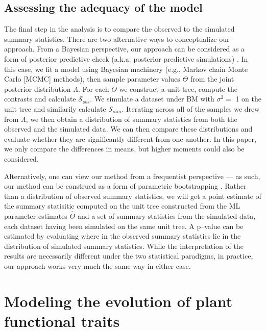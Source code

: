 \documentclass[a4paper,12pt]{article}
\begin{document}
\subsection{Assessing the adequacy of the model}
The final step in the analysis is to compare the observed to the simulated summary statistics. There are two alternative ways to conceptualize our approach. From a Bayesian perspective, our approach can be considered as a form of posterior predictive check (a.k.a. posterior predictive simulations) \citep{Rubin1984, Gelman1996}. In this case, we fit a model using Bayesian machinery (e.g., Markov chain Monte Carlo [MCMC] methods), then sample parameter values $\Theta$ from the joint posterior distribution $\Lambda$. For each $\Theta$ we construct a unit tree, compute the contrasts and calculate $\mathcal{S}_{obs}$. We simulate a dataset under BM with $\sigma^2 =$ 1 on the unit tree and similarily calculate $\mathcal{S}_{sim}$. Iterating across all of the samples we drew from $\Lambda$, we then obtain a distribution of summary statistics from both the observed and the simulated data. We can then compare these distributions and evaluate whether they are significantly different from one another. In this paper, we only compare the differences in means, but higher moments could also be considered. 

Alternatively, one can view our method from a frequentist perspective --- as such, our method can be construed as a form of parametric bootstrapping \citep{Efronbootstrap}. Rather than a distribution of observed summary statistics, we will get a point estimate of the summary statisitic computed on the unit tree constructed from the ML parameter estimates $\hat{\Theta}$ and a set of summary statistics from the simulated data, each dataset having been simulated on the same unit tree. A p--value can be estimated by evaluating where in the observed summary statistics lie in the distribution of simulated summary statistics. While the interpretation of the results are necessarily different under the two statistical paradigms, in practice, our approach works very much the same way in either case.

\section{Modeling the evolution of plant functional traits}
\end{document}
